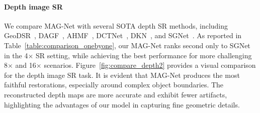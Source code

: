 \documentclass[lettersize,journal]{IEEEtran}
\begin{document}
\paragraph{Depth image SR}
We compare MAG-Net with several SOTA depth SR methods, including GeoDSR~\cite{compare_depth_geodsr}, DAGF~\cite{compare_depth_dagf:zhong2023deep}, AHMF~\cite{compare_depth_ahmf:zhong2021high}, DCTNet~\cite{compare_depth_dctnet:zhao2022discrete}, DKN~\cite{depth_kim2021deformable}, and SGNet~\cite{depth_wang2024sgnet}. 
As reported in Table~\ref{table:comparison_onebyone}, our MAG-Net ranks second only to SGNet in the 4$\times$ SR setting, while achieving the best performance for more challenging 8$\times$ and 16$\times$ scenarios.
Figure~\ref{fig:compare_depth2} provides a visual comparison for the depth image SR task. It is evident that MAG-Net produces the most faithful restorations, especially around complex object boundaries. The reconstructed depth maps are more accurate and exhibit fewer artifacts, highlighting the advantages of our model in capturing fine geometric details.



\end{document}
